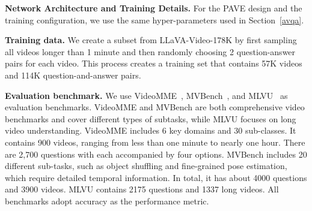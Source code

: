 \medskip
\noindent \textbf{Network Architecture and Training Details.} For the PAVE design and the training configuration, we use the same hyper-parameters used in Section~\ref{avqa}.



\medskip
\noindent\textbf{Training data.} We create a subset from LLaVA-Video-178K \cite{zhang2024videoinstructiontuningsynthetic} by first sampling all videos longer than 1 minute and then randomly choosing 2 question-answer pairs for each video. This process creates a training set that contains 57K videos and 114K question-and-answer pairs. 


\medskip
\noindent\textbf{Evaluation benchmark.} We use VideoMME~\cite{fu2024video}, MVBench~\cite{li2023mvbench}, and MLVU~\cite{zhou2025mlvubenchmarkingmultitasklong} as evaluation benchmarks. VideoMME and MVBench are both comprehensive video benchmarks and cover different types of subtasks, while MLVU focuses on long video understanding.
VideoMME includes 6 key domains and 30 sub-classes. It contains 900 videos, ranging from less than one minute to nearly one hour. There are 2,700 questions with each accompanied by four options. %
MVBench includes 20 different sub-tasks, such as object shuffling and fine-grained pose estimation, which require detailed temporal information. In total, it has about 4000 questions and 3900 videos. %
MLVU contains 2175 questions and 1337 long videos.
All benchmarks adopt accuracy as the performance metric.


